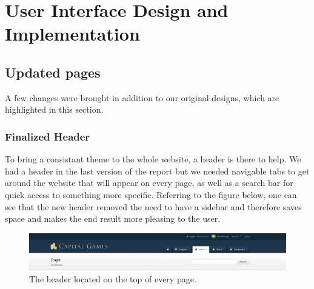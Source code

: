 \chapter{User Interface Design and Implementation}

\section{Updated pages}
A few changes were brought in addition to our original designs, which are highlighted in this section.
\subsection{Finalized Header}
To bring a consistant theme to the whole website, a header is there to help. We had a header in the last version of the report but we needed navigable tabs to get around the website that will appear on every page, as well as a search bar for quick access to something more specific. Referring to the figure below, one can see that the new header removed the need to have a sidebar and therefore saves space and makes the end result more pleasing to the user. 
\begin{figure}[H]
\centering
\includegraphics[width=5.5in]{./mockups/JPEG/headernew.jpg}
\caption{The header located on the top of every page.}
\end{figure}

